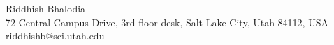\documentclass[twocolumn]{cinc}
\begin{document}





\begin{correspondence}
Riddhish Bhalodia\\
72 Central Campus Drive, 3rd floor desk, Salt Lake City, Utah-84112, USA  \\
riddhishb@sci.utah.edu
\end{correspondence}
\end{document}
